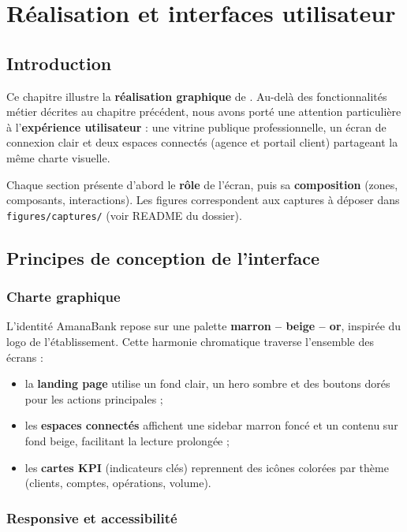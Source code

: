 \chapter{Réalisation et interfaces utilisateur}
\label{ch:realisation}

\section{Introduction}

Ce chapitre illustre la \textbf{réalisation graphique} de \nomapplication. Au-delà des fonctionnalités métier décrites au chapitre précédent, nous avons porté une attention particulière à l'\textbf{expérience utilisateur} : une vitrine publique professionnelle, un écran de connexion clair et deux espaces connectés (agence et portail client) partageant la même charte visuelle.

Chaque section présente d'abord le \textbf{rôle} de l'écran, puis sa \textbf{composition} (zones, composants, interactions). Les figures correspondent aux captures à déposer dans \texttt{figures/captures/} (voir README du dossier).

\section{Principes de conception de l'interface}

\subsection{Charte graphique}

L'identité AmanaBank repose sur une palette \textbf{marron -- beige -- or}, inspirée du logo de l'établissement. Cette harmonie chromatique traverse l'ensemble des écrans :

\begin{itemize}[leftmargin=*]
    \item la \textbf{landing page} utilise un fond clair, un hero sombre et des boutons dorés pour les actions principales ;
    \item les \textbf{espaces connectés} affichent une sidebar marron foncé et un contenu sur fond beige, facilitant la lecture prolongée ;
    \item les \textbf{cartes KPI} (indicateurs clés) reprennent des icônes colorées par thème (clients, comptes, opérations, volume).
\end{itemize}

\subsection{Responsive et accessibilité}

